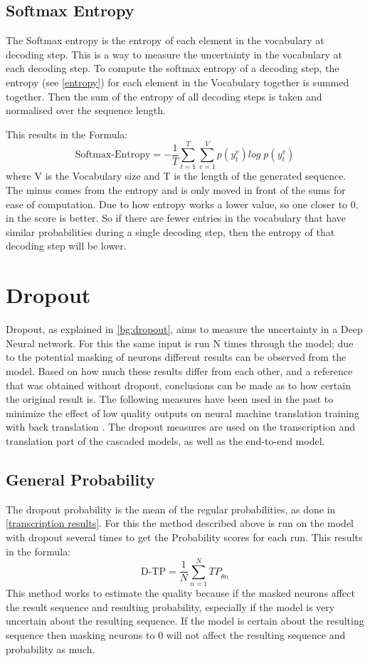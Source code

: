 \subsection{Softmax Entropy}\label{sect:entropy}
The Softmax entropy is the entropy of each element in the vocabulary at decoding step. This is a way to measure the uncertainty in the vocabulary at each decoding step.
To compute the softmax entropy of a decoding step, the entropy (see \autoref{entropy}) for each element in the Vocabulary together is summed together. 
Then the sum of the entropy of all decoding steps is taken and normalised over the sequence length. 

This results in the Formula:
$$\text{Softmax-Entropy}=-\frac{1}{T}\sum_{t=1}^T\sum_{v=1}^V p(y_t^v)log\; p(y_t^v) \label{formula:translation entropy}$$ where V is the Vocabulary size and T is the length of the generated sequence. The minus comes from the entropy and is only moved in front of the sums for ease of computation.
Due to how entropy works a lower value, so one closer to 0, in the score is better. So if there are fewer entries in the vocabulary that have similar probabilities during a single decoding step, then the entropy of that decoding step will be lower.



\section{Dropout}
Dropout, as explained in \autoref{bg:dropout}, aims to measure the uncertainty in a Deep Neural network. 
For this the same input is run N times through the model; due to the potential masking of neurons different results can be observed from the model. Based on how much these results differ from each other, and a reference that was obtained without dropout, conclusions can be made as to how certain the original result is. 
The following measures have been used in the past to minimize the effect of low quality outputs on neural machine translation training with back translation \cite{wang-etal-2018-alibaba}.
The dropout measures are used on the transcription and translation part of the cascaded models, as well as the end-to-end model.


\subsection{General Probability}
\label{dropoutprob}
The dropout probability is the mean of the regular probabilities, as done in \autoref{transcription results}. 
For this the method described above is run on the model with dropout several times to get the Probability scores for each run. 
This results in the formula:
$$\text{D-TP}=\frac{1}{N}\sum_{n=1}^N TP_{\hat\theta n}\label{formula:dropoutprobability}$$
This method works to estimate the quality because if the masked neurons affect the result sequence and resulting probability, especially if the model is very uncertain about the resulting sequence. 
If the model is certain about the resulting sequence then masking neurons to 0 will not affect the resulting sequence and probability as much. 

